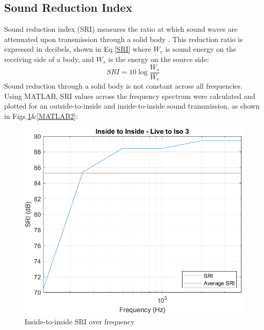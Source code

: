 \documentclass[10pt, twocolumn]{article}
\begin{document}
        \subsection{Sound Reduction Index}
            Sound reduction index (SRI) measures the ratio at which sound waves are attenuated upon transmission through a solid body \cite{REDBOOK}.
            This reduction ratio is expressed in decibels, shown in Eq.\ref{SRI} where $W_r$ is sound energy on the receiving side of a body, and $W_s$ is the energy on the source side:
            \begin{equation}\label{SRI}
                SRI = 10\log{\frac{W_s}{W_r}}
            \end{equation}
            Sound reduction through a solid body is not constant across all frequencies.
            Using MATLAB, SRI values across the frequency spectrum were calculated and plotted for an outside-to-inside and inside-to-inside sound transmission, as shown in Figs.\ref{MATLAB1}\&\ref{MATLAB2}:
            \begin{figure}[H]
                \centering
                \includegraphics[scale = 0.6]{resources/I2ILive2Iso3.png}
                \caption{Inside-to-inside SRI over frequency}
                \label{MATLAB1}
            \end{figure}
\end{document}
